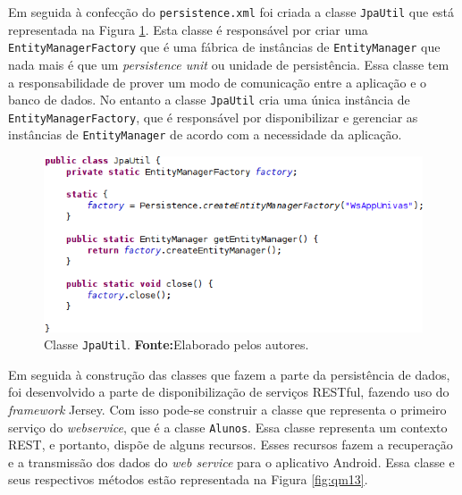 			\par Em seguida à confecção do \texttt{persistence.xml} foi criada a
		classe \texttt{JpaUtil} que está representada na Figura \ref{fig:qm12}.
		Esta classe é responsável por criar uma \texttt{EntityManagerFactory} que é
		uma  fábrica de instâncias de \texttt{EntityManager} que nada mais é que um
		\textit{persistence unit} ou unidade de persistência. Essa classe tem a
		responsabilidade de prover um modo de comunicação entre a aplicação e o banco
		de dados. No entanto a classe \texttt{JpaUtil} cria uma única instância de
		\texttt{EntityManagerFactory}, que é responsável por disponibilizar e
		gerenciar as instâncias de \texttt{EntityManager} de acordo com a necessidade
		da aplicação.
		
		\pagebreak
		\begin{figure}[h!]
			\centerline{\includegraphics[scale=0.7]{./imagens/2_q_metodologico/qm12.png}}
			\caption[Classe \texttt{JpaUtil}]{Classe \texttt{JpaUtil}.
			\textbf{Fonte:}Elaborado pelos autores.}
			\label{fig:qm12}
		\end{figure}
		
	\par Em seguida à construção das classes que fazem a parte da persistência de
dados, foi desenvolvido a parte de disponibilização de serviços
RESTful, fazendo uso do \textit{framework} Jersey. Com isso
pode-se construir a classe que representa o primeiro serviço do
\textit{webservice}, que é a classe \texttt{Alunos}. Essa classe representa um
contexto REST, e portanto, dispõe de alguns recursos. Esses recursos fazem a
recuperação e a transmissão dos dados do \textit{web service} para o aplicativo
Android. Essa classe e seus respectivos métodos  estão representada na
Figura \ref{fig:qm13}.

